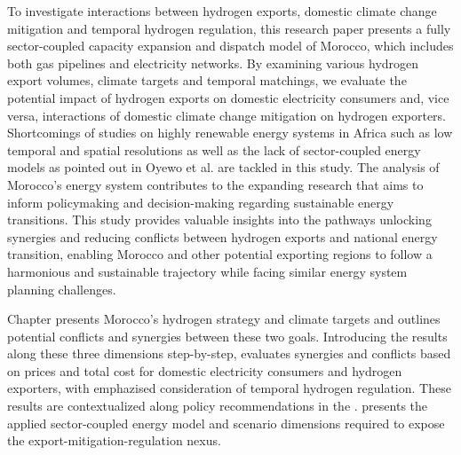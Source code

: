 To investigate interactions between hydrogen exports, domestic climate change mitigation and temporal hydrogen regulation, this research paper presents a fully sector-coupled capacity expansion and dispatch model of Morocco, which includes both gas pipelines and electricity networks. By examining various hydrogen export volumes, climate targets and temporal matchings, we evaluate the potential impact of hydrogen exports on domestic electricity consumers and, vice versa, interactions of domestic climate change mitigation on hydrogen exporters.
Shortcomings of studies on highly renewable energy systems in Africa such as low temporal and spatial resolutions as well as the lack of sector-coupled energy models as pointed out in Oyewo et al.\cite{Oyewo2023} are tackled in this study. The analysis of Morocco's energy system contributes to the expanding research that aims to inform policymaking and decision-making regarding sustainable energy transitions. This study provides valuable insights into the pathways unlocking synergies and reducing conflicts between hydrogen exports and national energy transition, enabling Morocco and other potential exporting regions to follow a harmonious and sustainable trajectory while facing similar energy system planning challenges.

Chapter  presents Morocco's hydrogen strategy and climate targets and outlines potential conflicts and synergies between these two goals. Introducing the results along these three dimensions step-by-step,  evaluates synergies and conflicts based on prices and total cost for domestic electricity consumers and hydrogen exporters, with emphazised consideration of temporal hydrogen regulation. These results are contextualized along policy recommendations in the .  presents the applied sector-coupled energy model and scenario dimensions required to expose the export-mitigation-regulation nexus.
